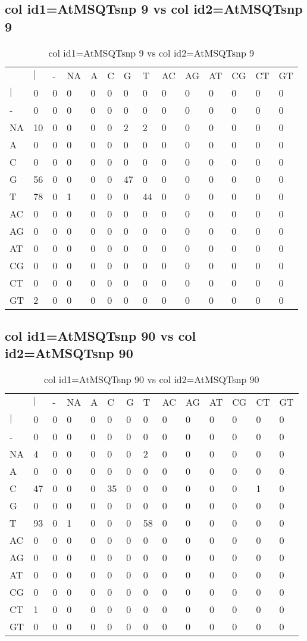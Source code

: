 \subsection{col id1=AtMSQTsnp 9 vs col id2=AtMSQTsnp 9}
\begin{center}
\begin{longtable}{|l|l|l|l|l|l|l|l|l|l|l|l|l|l|}
\caption{col id1=AtMSQTsnp 9 vs col id2=AtMSQTsnp 9} \label{table_dm774}\\
\hline
\\
\hline
&$|$&-&NA&A&C&G&T&AC&AG&AT&CG&CT&GT\\
$|$&0&0&0&0&0&0&0&0&0&0&0&0&0\\
-&0&0&0&0&0&0&0&0&0&0&0&0&0\\
NA&10&0&0&0&0&2&2&0&0&0&0&0&0\\
A&0&0&0&0&0&0&0&0&0&0&0&0&0\\
C&0&0&0&0&0&0&0&0&0&0&0&0&0\\
G&56&0&0&0&0&47&0&0&0&0&0&0&0\\
T&78&0&1&0&0&0&44&0&0&0&0&0&0\\
AC&0&0&0&0&0&0&0&0&0&0&0&0&0\\
AG&0&0&0&0&0&0&0&0&0&0&0&0&0\\
AT&0&0&0&0&0&0&0&0&0&0&0&0&0\\
CG&0&0&0&0&0&0&0&0&0&0&0&0&0\\
CT&0&0&0&0&0&0&0&0&0&0&0&0&0\\
GT&2&0&0&0&0&0&0&0&0&0&0&0&0\\
\hline
\end{longtable}
\end{center}

\subsection{col id1=AtMSQTsnp 90 vs col id2=AtMSQTsnp 90}
\begin{center}
\begin{longtable}{|l|l|l|l|l|l|l|l|l|l|l|l|l|l|}
\caption{col id1=AtMSQTsnp 90 vs col id2=AtMSQTsnp 90} \label{table_dm776}\\
\hline
\\
\hline
&$|$&-&NA&A&C&G&T&AC&AG&AT&CG&CT&GT\\
$|$&0&0&0&0&0&0&0&0&0&0&0&0&0\\
-&0&0&0&0&0&0&0&0&0&0&0&0&0\\
NA&4&0&0&0&0&0&2&0&0&0&0&0&0\\
A&0&0&0&0&0&0&0&0&0&0&0&0&0\\
C&47&0&0&0&35&0&0&0&0&0&0&1&0\\
G&0&0&0&0&0&0&0&0&0&0&0&0&0\\
T&93&0&1&0&0&0&58&0&0&0&0&0&0\\
AC&0&0&0&0&0&0&0&0&0&0&0&0&0\\
AG&0&0&0&0&0&0&0&0&0&0&0&0&0\\
AT&0&0&0&0&0&0&0&0&0&0&0&0&0\\
CG&0&0&0&0&0&0&0&0&0&0&0&0&0\\
CT&1&0&0&0&0&0&0&0&0&0&0&0&0\\
GT&0&0&0&0&0&0&0&0&0&0&0&0&0\\
\hline
\end{longtable}
\end{center}

